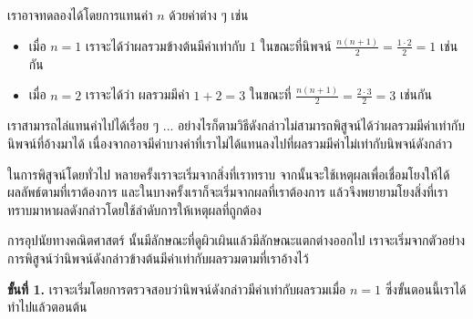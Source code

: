 เรา{\wbr}อาจ{\wbr}ทดลอง{\wbr}ได้{\wbr}โดย{\wbr}การ{\wbr}แทน{\wbr}ค่า $ n $ ด้วย{\wbr}ค่า{\wbr}ต่าง ๆ เช่น{\wbr}

\begin{itemize}
\item เมื่อ $ n=1 $ เรา{\wbr}จะ{\wbr}ได้{\wbr}ว่า{\wbr}ผลรวม{\wbr}ข้างต้น{\wbr}มี{\wbr}ค่า{\wbr}เท่า{\wbr}กับ $ 1 $ ใน{\wbr}ขณะที่{\wbr}นิพจน์ $
  \frac{n(n+1)}{2}=\frac{1\cdot 2}{2}=1 $ เช่นกัน{\wbr}
\item เมื่อ $ n=2 $ เรา{\wbr}จะ{\wbr}ได้{\wbr}ว่า ผลรวม{\wbr}มี{\wbr}ค่า $ 1+2=3 $ ใน{\wbr}ขณะที่ $
  \frac{n(n+1)}{2}=\frac{2\cdot 3}{2}=3 $ เช่นกัน{\wbr}
\end{itemize}

เรา{\wbr}สามารถ{\wbr}ไล่{\wbr}แทน{\wbr}ค่า{\wbr}ไป{\wbr}ได้{\wbr}เรื่อย ๆ
... อย่างไรก็ตาม{\wbr}วิธี{\wbr}ดังกล่าว{\wbr}ไม่{\wbr}สามารถ{\wbr}พิสูจน์{\wbr}ได้{\wbr}ว่า{\wbr}ผลรวม{\wbr}มี{\wbr}ค่า{\wbr}เท่า{\wbr}กับ{\wbr}นิพจน์{\wbr}ที่{\wbr}อ้าง{\wbr}มา{\wbr}ได้{\wbr}
เนื่องจาก{\wbr}อาจ{\wbr}มี{\wbr}ค่า{\wbr}บาง{\wbr}ค่า{\wbr}ที่{\wbr}เรา{\wbr}ไม่{\wbr}ได้{\wbr}แทน{\wbr}ลง{\wbr}ไป{\wbr}ที่{\wbr}ผลรวม{\wbr}มี{\wbr}ค่า{\wbr}ไม่{\wbr}เท่า{\wbr}กับ{\wbr}นิพจน์{\wbr}ดังกล่าว{\wbr}

ใน{\wbr}การ{\wbr}พิสูจน์{\wbr}โดย{\wbr}ทั่วไป หลาย{\wbr}ครั้ง{\wbr}เรา{\wbr}จะ{\wbr}เริ่ม{\wbr}จาก{\wbr}สิ่ง{\wbr}ที่{\wbr}เรา{\wbr}ทราบ{\wbr}
จากนั้น{\wbr}จะ{\wbr}ใช้{\wbr}เหตุผล{\wbr}เพื่อ{\wbr}เชื่อมโยง{\wbr}ให้{\wbr}ได้{\wbr}ผลลัพธ์{\wbr}ตาม{\wbr}ที่{\wbr}เรา{\wbr}ต้องการ{\wbr}
และ{\wbr}ใน{\wbr}บาง{\wbr}ครั้ง{\wbr}เรา{\wbr}ก็{\wbr}จะ{\wbr}เริ่ม{\wbr}จาก{\wbr}ผล{\wbr}ที่{\wbr}เรา{\wbr}ต้องการ{\wbr}
แล้ว{\wbr}จึง{\wbr}พยายาม{\wbr}โยง{\wbr}สิ่ง{\wbr}ที่{\wbr}เรา{\wbr}ทราบ{\wbr}มา{\wbr}หา{\wbr}ผล{\wbr}ดังกล่าว{\wbr}โดย{\wbr}ใช้{\wbr}ลำดับ{\wbr}การ{\wbr}ให้{\wbr}เหตุผล{\wbr}ที่{\wbr}ถูกต้อง{\wbr}

การ{\wbr}อุปนัย{\wbr}ทาง{\wbr}คณิตศาสตร์ นั้น{\wbr}มี{\wbr}ลักษณะ{\wbr}ที่{\wbr}ดู{\wbr}ผิวเผิน{\wbr}แล้ว{\wbr}มี{\wbr}ลักษณะ{\wbr}แตกต่าง{\wbr}ออก{\wbr}ไป{\wbr}
เรา{\wbr}จะ{\wbr}เริ่ม{\wbr}จาก{\wbr}ตัวอย่าง{\wbr}การ{\wbr}พิสูจน์{\wbr}ว่า{\wbr}นิพจน์{\wbr}ดังกล่าว{\wbr}ข้างต้น{\wbr}มี{\wbr}ค่า{\wbr}เท่า{\wbr}กับ{\wbr}ผลรวม{\wbr}ตาม{\wbr}ที่{\wbr}เรา{\wbr}อ้าง{\wbr}ไว้{\wbr}

{\bf ขั้น{\wbr}ที่ 1.} เรา{\wbr}จะ{\wbr}เริ่ม{\wbr}โดย{\wbr}การ{\wbr}ตรวจสอบ{\wbr}ว่า{\wbr}นิพจน์{\wbr}ดังกล่าว{\wbr}มี{\wbr}ค่า{\wbr}เท่า{\wbr}กับ{\wbr}ผลรวม{\wbr}เมื่อ $ n=1 $ ซึ่ง{\wbr}ขั้นตอน{\wbr}นี้{\wbr}เรา{\wbr}ได้{\wbr}ทำ{\wbr}ไป{\wbr}แล้ว{\wbr}ตอน{\wbr}ต้น{\wbr}

